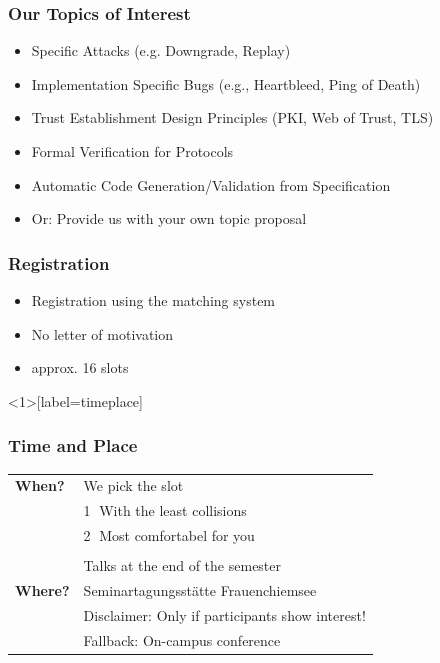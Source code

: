 \documentclass[xcolor={usenames,dvipsnames}]{beamer}
\begin{document}
\begin{frame}
	\frametitle{Our Topics of Interest}
	\begin{itemize}
		\item Specific Attacks (e.g. Downgrade, Replay) %
		\item Implementation Specific Bugs (e.g., Heartbleed, Ping of Death)
    		\item Trust Establishment Design Principles (PKI, Web of Trust, TLS)
    		\item Formal Verification for Protocols
		\item Automatic Code Generation/Validation from Specification
		\item \alert{Or:} Provide us with your own topic proposal
	\end{itemize}
\end{frame}

\begin{frame}
	\frametitle{Registration}
	\begin{itemize}
		\item Registration using the \alert{matching system}
	  	\item \alert{No} letter of motivation
		\item approx. \alert{16} slots
	\end{itemize}
\end{frame}

\begin{frame}<1>[label=timeplace]
	\frametitle{Time and Place}
	\begin{center}
		\begin{tabular}{ll}
		        \textbf{When?}  & We pick the slot\\
		        						&\textcircled{1} With the least collisions\\
		        						&\textcircled{2} Most comfortabel for you\\
					&\\
					& Talks at the \alert{end} of the semester \\
			\textbf{Where?} & \pause Seminartagungsstätte Frauenchiemsee                 \\
			                & \alert{Disclaimer}: Only if participants show interest! \\
			                & Fallback: On-campus conference
		\end{tabular}
	\end{center}
\end{frame}
\end{document}
